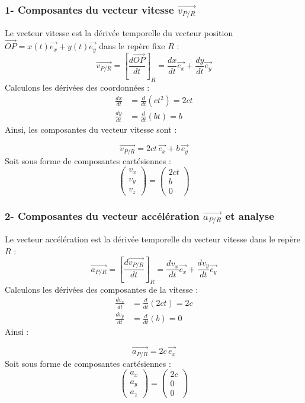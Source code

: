 \documentclass[11pt,a4paper]{article}
\begin{document}
\subsubsection*{1- Composantes du vecteur vitesse $\vec{v_{P/R}}$}
Le vecteur vitesse est la dérivée temporelle du vecteur position $\vec{OP} = x(t)\vec{e_x} + y(t)\vec{e_y}$ dans le repère fixe $R$ :
$$ \vec{v_{P/R}} = \left[\frac{d\vec{OP}}{dt}\right]_R = \frac{dx}{dt} \vec{e_x} + \frac{dy}{dt} \vec{e_y} $$
Calculons les dérivées des coordonnées :
\begin{align*}
\frac{dx}{dt} &= \frac{d}{dt}(c t^2) = 2ct \\
\frac{dy}{dt} &= \frac{d}{dt}(bt) = b
\end{align*}
Ainsi, les composantes du vecteur vitesse sont :
\begin{sonucbox}
$$ \vec{v_{P/R}} = 2ct \, \vec{e_x} + b \, \vec{e_y} $$
Soit sous forme de composantes cartésiennes :
$$ \begin{pmatrix} v_x \\ v_y \\ v_z \end{pmatrix} = \begin{pmatrix} 2ct \\ b \\ 0 \end{pmatrix} $$
\end{sonucbox}

\subsubsection*{2- Composantes du vecteur accélération $\vec{a_{P/R}}$ et analyse}
Le vecteur accélération est la dérivée temporelle du vecteur vitesse dans le repère $R$ :
$$ \vec{a_{P/R}} = \left[\frac{d\vec{v_{P/R}}}{dt}\right]_R = \frac{dv_x}{dt} \vec{e_x} + \frac{dv_y}{dt} \vec{e_y} $$
Calculons les dérivées des composantes de la vitesse :
\begin{align*}
\frac{dv_x}{dt} &= \frac{d}{dt}(2ct) = 2c \\
\frac{dv_y}{dt} &= \frac{d}{dt}(b) = 0
\end{align*}
Ainsi :
\begin{sonucbox}
$$ \vec{a_{P/R}} = 2c \, \vec{e_x} $$
Soit sous forme de composantes cartésiennes :
$$ \begin{pmatrix} a_x \\ a_y \\ a_z \end{pmatrix} = \begin{pmatrix} 2c \\ 0 \\ 0 \end{pmatrix} $$
\end{sonucbox}
\end{document}
